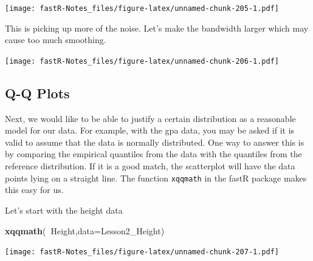 \documentclass[]{book}
\newenvironment{Shaded}{\begin{snugshade}}{\end{snugshade}}
\newcommand{\KeywordTok}[1]{\textcolor[rgb]{0.13,0.29,0.53}{\textbf{#1}}}
\newcommand{\DataTypeTok}[1]{\textcolor[rgb]{0.13,0.29,0.53}{#1}}
\newcommand{\DecValTok}[1]{\textcolor[rgb]{0.00,0.00,0.81}{#1}}
\newcommand{\StringTok}[1]{\textcolor[rgb]{0.31,0.60,0.02}{#1}}
\newcommand{\OperatorTok}[1]{\textcolor[rgb]{0.81,0.36,0.00}{\textbf{#1}}}
\newcommand{\NormalTok}[1]{#1}
\theoremstyle{definition}
\theoremstyle{definition}
\theoremstyle{definition}
\theoremstyle{remark}
\begin{document}
\begin{Shaded}
\end{Shaded}

\texttt{[image: fastR-Notes\_files/figure-latex/unnamed-chunk-205-1.pdf]}

This is picking up more of the noise. Let's make the bandwidth larger
which may cause too much smoothing.

\begin{Shaded}
\end{Shaded}

\texttt{[image: fastR-Notes\_files/figure-latex/unnamed-chunk-206-1.pdf]}

\subsection{Q-Q Plots}\label{q-q-plots}

Next, we would like to be able to justify a certain distribution as a
reasonable model for our data. For example, with the gpa data, you may
be asked if it is valid to assume that the data is normally distributed.
One way to answer this is by comparing the empirical quantiles from the
data with the quantiles from the reference distribution. If it is a good
match, the scatterplot will have the data points lying on a straight
line. The function \texttt{xqqmath} in the fastR package makes this easy
for us.

Let's start with the height data

\begin{Shaded}
\begin{Highlighting}[]
\KeywordTok{xqqmath}\NormalTok{(}\OperatorTok{~}\NormalTok{Height,}\DataTypeTok{data=}\NormalTok{Lesson2_Height)}
\end{Highlighting}
\end{Shaded}

\texttt{[image: fastR-Notes\_files/figure-latex/unnamed-chunk-207-1.pdf]}
\end{document}
